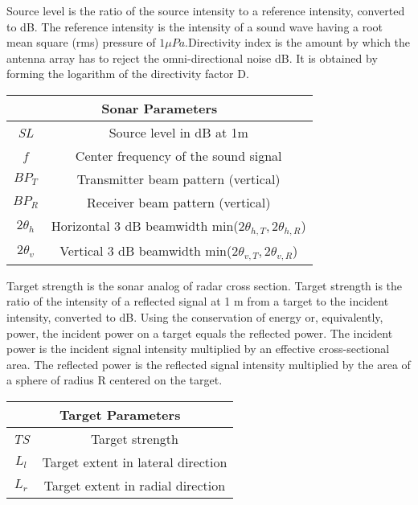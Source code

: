 \noindent Source level is the ratio of the source intensity to a reference intensity, converted to dB. The reference intensity is the intensity of a sound wave having a root mean square (rms) pressure of $1 \mu Pa.$Directivity index is the amount by which the antenna array has to reject the omni-directional noise dB. It is obtained by forming the logarithm of the directivity factor D.
\begin{center}
\begin{tabular}{ |c|c| } 
 \hline
 \multicolumn{2}{|c|}{Sonar Parameters} \\
 \hline
  \textit{SL} & Source level in dB at 1m  \\ 
  \textit{f} & Center frequency of the sound signal  \\ 
  \textit{$BP_T$} & Transmitter beam pattern (vertical)  \\ 
  \textit{$BP_R$} & Receiver beam pattern (vertical)  \\ 
  $2 \theta_{h}$ & Horizontal 3 dB beamwidth min($2\theta_{h,T}, 2\theta_{h,R}$) \\
   $2 \theta_{v}$ & Vertical 3 dB beamwidth min($2\theta_{v,T}, 2\theta_{v,R}$) \\
  \hline
\end{tabular}
\end{center}

\noindent Target strength is the sonar analog of radar cross section. Target strength is the ratio of the intensity of a reflected signal at 1 m from a target to the incident intensity, converted to dB. Using the conservation of energy or, equivalently, power, the incident power on a target equals the reflected power. The incident power is the incident signal intensity multiplied by an effective cross-sectional area. The reflected power is the reflected signal intensity multiplied by the area of a sphere of radius R centered on the target. 
\begin{center}
\begin{tabular}{ |c|c| } 
 \hline
 \multicolumn{2}{|c|}{Target Parameters} \\
 \hline
  \textit{TS} & Target strength  \\ 
  \textit{$L_l$} & Target extent in lateral direction \\ 
  \textit{$L_r$} & Target extent in radial direction \\ 
  \hline
\end{tabular}
\end{center}

